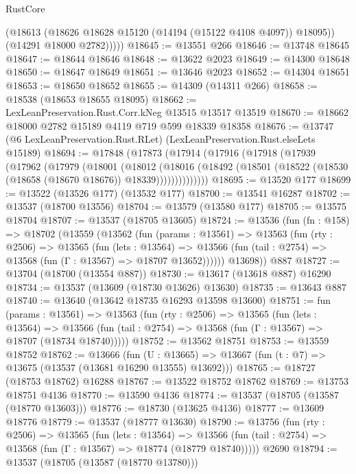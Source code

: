 \begin{lexlean}{RustCore}
\begin{coremodule}
            (@18613 (@18626 @18628 @15120 (@14194 (@15122 @4108 @4097)) @18095))
            (@14291 @18000 @2782)))))
@18645 := @13551 @266
@18646 := @13748 @18645
@18647 := @18644 @18646
@18648 := @13622 @2023
@18649 := @14300 @18648
@18650 := @18647 @18649
@18651 := @13646 @2023
@18652 := @14304 @18651
@18653 := @18650 @18652
@18655 := @14309 (@14311 @266)
@18658 := @18538 (@18653 @18655 @18095)
@18662 := LexLeanPreservation.Rust.Corr.kNeg @13515 @13517 @13519
@18670 := @18662 @18000 @2782 @15189 @4119 @719 @599 @18339 @18358
@18676 := @13747 (@6 LexLeanPreservation.Rust.RLet) (LexLeanPreservation.Rust.elseLets @15189)
@18694 := @17848
    (@17873
      (@17914
        (@17916
          (@17918
            (@17939
              (@17962
                (@17979
                  (@18001
                    (@18012
                      (@18016
                        (@18492
                          (@18501 (@18522 (@18530 (@18658 (@18670 @18676)) @18339))))))))))))))
@18695 := @13520 @177
@18699 := @13522 (@13526 @177) (@13532 @177)
@18700 := @13541 @16287
@18702 := @13537 (@18700 @13556)
@18704 := @13579 (@13580 @177)
@18705 := @13575 @18704
@18707 := @13537 (@18705 @13605)
@18724 := @13536
    (fun (fn : @158) =>
    @18702
      (@13559
        (@13562
          (fun (params : @13561) =>
          @13563
            (fun (rty : @2506) =>
            @13565
              (fun (lets : @13564) =>
              @13566 (fun (tail : @2754) => @13568 (fun (Γ : @13567) => @18707 @13652))))))
        @13698))
    @887
@18727 := @13704 (@18700 (@13554 @887))
@18730 := @13617 (@13618 @887) @16290
@18734 := @13537 (@13609 (@18730 @13626) @13630)
@18735 := @13643 @887
@18740 := @13640 (@13642 @18735 @16293 @13598 @13600)
@18751 := fun (params : @13561) =>
  @13563
    (fun (rty : @2506) =>
    @13565
      (fun (lets : @13564) =>
      @13566 (fun (tail : @2754) => @13568 (fun (Γ : @13567) => @18707 (@18734 @18740)))))
@18752 := @13562 @18751
@18753 := @13559 @18752
@18762 := @13666
    (fun (U : @13665) => @13667 (fun (t : @7) => @13675 (@13537 (@13681 @16290 @13555) @13692)))
@18765 := @18727 (@18753 @18762) @16288
@18767 := @13522 @18752 @18762
@18769 := @13753 @18751 @4136
@18770 := @13590 @4136
@18774 := @13537 (@18705 (@13587 (@18770 @13603)))
@18776 := @18730 (@13625 @4136)
@18777 := @13609 @18776
@18779 := @13537 (@18777 @13630)
@18790 := @13756
    (fun (rty : @2506) =>
    @13565
      (fun (lets : @13564) =>
      @13566 (fun (tail : @2754) => @13568 (fun (Γ : @13567) => @18774 (@18779 @18740)))))
    @2690
@18794 := @13537 (@18705 (@13587 (@18770 @13780)))

\end{coremodule}
\end{lexlean}

